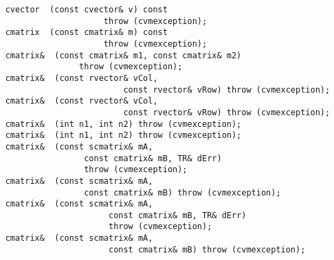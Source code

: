 \verb"    cvector "\verb" (const cvector& v) const"\\
\verb"                        throw (cvmexception);"\\
\verb"    cmatrix "\verb" (const cmatrix& m) const"\\
\verb"                        throw (cvmexception);"\\
\verb"    cmatrix& "\verb" (const cmatrix& m1, const cmatrix& m2)"\\
\verb"                   throw (cvmexception);"\\
\verb"    cmatrix& "\verb" (const rvector& vCol,"\\
\verb"                            const rvector& vRow) throw (cvmexception);"\\
\verb"    cmatrix& "\verb" (const rvector& vCol,"\\
\verb"                            const rvector& vRow) throw (cvmexception);"\\
\verb"    cmatrix& "\verb" (int n1, int n2) throw (cvmexception);"\\
\verb"    cmatrix& "\verb" (int n1, int n2) throw (cvmexception);"\\
\verb"    cmatrix& "\verb" (const scmatrix& mA,"\\
\verb"                    const cmatrix& mB, TR& dErr)"\\
\verb"                    throw (cvmexception);"\\
\verb"    cmatrix& "\verb" (const scmatrix& mA,"\\
\verb"                    const cmatrix& mB) throw (cvmexception);"\\
\verb"    cmatrix& "\verb" (const scmatrix& mA,"\\
\verb"                         const cmatrix& mB, TR& dErr)"\\
\verb"                         throw (cvmexception);"\\
\verb"    cmatrix& "\verb" (const scmatrix& mA,"\\
\verb"                         const cmatrix& mB) throw (cvmexception);"\\
